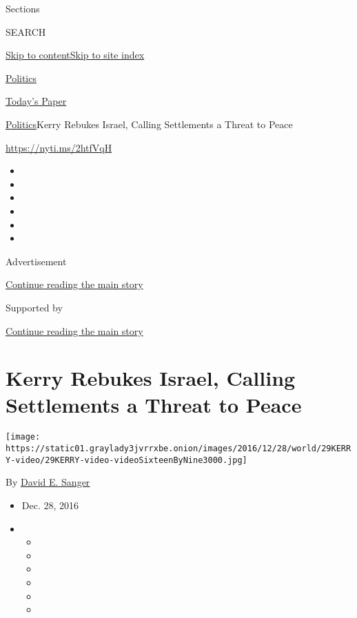 Sections

SEARCH

\protect\hyperlink{site-content}{Skip to
content}\protect\hyperlink{site-index}{Skip to site index}

\href{https://www.nytimes3xbfgragh.onion/section/politics}{Politics}

\href{https://myaccount.nytimes3xbfgragh.onion/auth/login?response_type=cookie\&client_id=vi}{}

\href{https://www.nytimes3xbfgragh.onion/section/todayspaper}{Today's
Paper}

\href{/section/politics}{Politics}\textbar{}Kerry Rebukes Israel,
Calling Settlements a Threat to Peace

\url{https://nyti.ms/2htfVqH}

\begin{itemize}
\item
\item
\item
\item
\item
\item
\end{itemize}

Advertisement

\protect\hyperlink{after-top}{Continue reading the main story}

Supported by

\protect\hyperlink{after-sponsor}{Continue reading the main story}

\hypertarget{kerry-rebukes-israel-calling-settlements-a-threat-to-peace}{%
\section{Kerry Rebukes Israel, Calling Settlements a Threat to
Peace}\label{kerry-rebukes-israel-calling-settlements-a-threat-to-peace}}

\texttt{[image: https://static01.graylady3jvrrxbe.onion/images/2016/12/28/world/29KERRY-video/29KERRY-video-videoSixteenByNine3000.jpg]}

By \href{http://www.nytimes3xbfgragh.onion/by/david-e-sanger}{David E.
Sanger}

\begin{itemize}
\item
  Dec. 28, 2016
\item
  \begin{itemize}
  \item
  \item
  \item
  \item
  \item
  \item
  \end{itemize}
\end{itemize}

